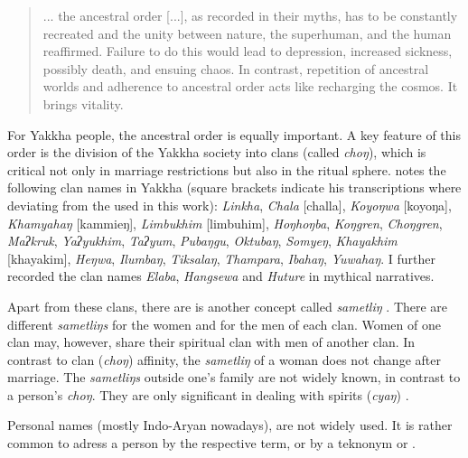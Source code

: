 \begin{quote}
... the  ancestral order [...], as recorded in their myths, has to be constantly recreated and the unity between nature, the superhuman, and the human reaffirmed. Failure to do this would lead to depression, increased sickness, possibly death, and ensuing chaos. In contrast, repetition of ancestral worlds and adherence to ancestral order acts like recharging the cosmos. It brings vitality. \citep[12--3]{Hardman2000_Other}
\end{quote}

For  Yakkha people, the ancestral order is equally important. A key feature of this order is the division of the Yakkha society into clans (called \emph{choŋ}), which is critical not only in marriage restrictions but also in the ritual sphere. \citet[201]{Russell1992_Yakha} notes the following clan names in Yakkha (square brackets indicate his transcriptions where deviating from the  used in this work): \emph{Linkha}, \emph{Chala} [challa], \emph{Koyoŋwa} [koyoŋa], \emph{Khamyahaŋ} [kammieŋ], \emph{Limbukhim} [limbuhim], \emph{Hoŋhoŋba}, \emph{Koŋgren}, \emph{Choŋgren}, \emph{Maʔkruk}, \emph{Yaʔyukhim}, \emph{Taʔyum}, \emph{Pubaŋgu}, \emph{Oktubaŋ}, \emph{Somyeŋ}, \emph{Khayakhim} [khayakim], \emph{Heŋwa}, \emph{Ilumbaŋ}, \emph{Tiksalaŋ}, \emph{Thampara}, \emph{Ibahaŋ}, \emph{Yuwahaŋ}. I further recorded the clan names \emph{Elaba}, \emph{Hangsewa} and \emph{Huture} in mythical narratives. 

Apart from these clans, there are is another concept called \emph{sametliŋ} . There are different  \emph{sametliŋs} for the women and for the men of each clan. Women of one clan may, however, share their spiritual clan with men of another clan. In contrast to clan  (\emph{choŋ}) affinity, the \emph{sametliŋ} of a woman does not change after marriage. The \emph{sametliŋs} outside one's family are not widely known, in contrast to a person's \emph{choŋ}. They are only significant in dealing with spirits (\emph{cyaŋ}) \citep[166]{Russell1992_Yakha}.

Personal names (mostly Indo-Aryan nowadays), are not widely used. It is rather common to adress a person by the respective  term, or by a teknonym  or . 

